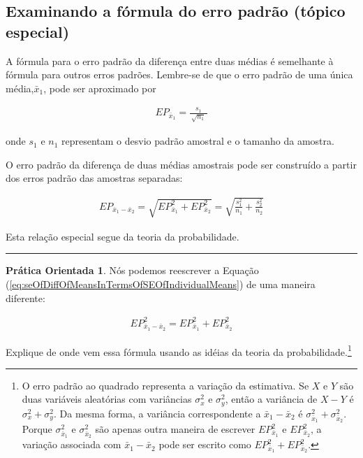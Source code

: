 \documentclass[
]{book}
\theoremstyle{definition}
\theoremstyle{definition}
\theoremstyle{definition}
\newtheorem{exercise}{Prática Orientada}[chapter]
\theoremstyle{definition}
\theoremstyle{remark}
\begin{document}
\hypertarget{examiningSEFormula}{%
\subsection{Examinando a fórmula do erro padrão (tópico especial)}\label{examiningSEFormula}}

A fórmula para o erro padrão da diferença entre duas médias é semelhante à fórmula para outros erros padrões. Lembre-se de que o erro padrão de uma única média,\(\bar{x}_1\), pode ser aproximado por

\begin{align*}
EP_{\bar{x}_1} = \frac{s_1}{\ \sqrt{n_1}\ }
\end{align*}

onde \(s_1\) e \(n_1\) representam o desvio padrão amostral e o tamanho da amostra.

O erro padrão da diferença de duas médias amostrais pode ser construído a partir dos erros padrão das amostras separadas:

\begin{eqnarray}
EP_{\bar{x}_{1} - \bar{x}_{2}}
    = \sqrt{EP_{\bar{x}_1}^2 + EP_{\bar{x}_2}^2}
    = \sqrt{\frac{s_1^2}{{n_1}} + \frac{s_2^2}{{n_2}}}
\label{eq:seOfDiffOfMeansInTermsOfSEOfIndividualMeans}
\end{eqnarray}

Esta relação especial segue da teoria da probabilidade.

\begin{center}\rule{0.5\linewidth}{0.5pt}\end{center}

\begin{exercise}
\protect\hypertarget{exr:unnamed-chunk-206}{}{\label{exr:unnamed-chunk-206} }Nós podemos reescrever a Equação (\eqref{eq:seOfDiffOfMeansInTermsOfSEOfIndividualMeans}) de uma maneira diferente:

\begin{eqnarray*}
EP_{\bar{x}_{1} - \bar{x}_{2}}^2 = EP_{\bar{x}_1}^2 + EP_{\bar{x}_2}^2
\end{eqnarray*}

Explique de onde vem essa fórmula usando as idéias da teoria da probabilidade.\footnote{O erro padrão ao quadrado representa a variação da estimativa. Se \(X\) e \(Y\) são duas variáveis aleatórias com variâncias \(\sigma_x^2\) e \(\sigma_y^2\), então a variância de \(X-Y\) é \(\sigma_x^2 + \sigma_y^2\). Da mesma forma, a variância correspondente a \(\bar{x}_1 - \bar{x}_2\) é \(\sigma_{\bar{x}_1}^2 + \sigma_{\bar{x}_2}^2\). Porque \(\sigma_{\bar{x}_1}^2\) e \(\sigma_{\bar{x}_2}^2\) são apenas outra maneira de escrever \(EP_{\bar{x}_1}^2\) e \(EP_{\bar{x}_2}^2\), a variação associada com \(\bar{x}_1 - \bar{x}_2\) pode ser escrito como \(EP_{\bar{x}_1}^2 + EP_{\bar{x}_2}^2\).}
\end{exercise}
\end{document}
